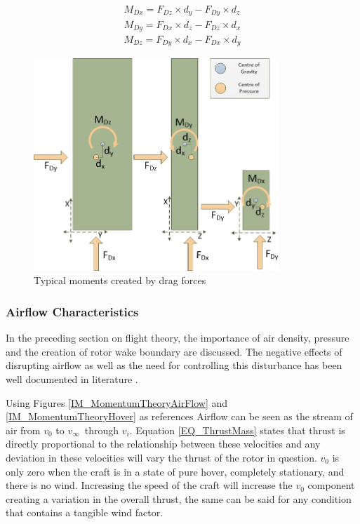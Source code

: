 		\begin{eqnarray}
		M_{Dx} = F_{Dz} \times d_y - F_{Dy} \times d_z \label{EQ_dragMomentsL}\\
		M_{Dy} = F_{Dx} \times d_z - F_{Dz} \times d_x \label{EQ_dragMomentsM}\\
		M_{Dz} = F_{Dy} \times d_x - F_{Dx} \times d_y \label{EQ_dragMomentsN}
		\end{eqnarray}
		
		\begin{figure}[H]
			\centering
			\includegraphics[height = 8cm]{Images/Literature/drag.jpg}     
			\caption{Typical moments created by drag forces}
			\label{IM_dragForces}
		\end{figure} 
				
		\subsubsection{Airflow Characteristics}
		
		In the preceding section on flight theory, the importance of air density, pressure and the creation of rotor wake boundary are discussed. The negative effects of disrupting airflow as well as the need for controlling this disturbance has been well documented in literature \cite{NearWall, Lee2012, Hoffmann}.
		
		Using Figures \ref{IM_MomentumTheoryAirFlow} and \ref{IM_MomentumTheoryHover} as references Airflow can be seen as the stream of air from $v_0$ to $v_\infty$\, through $v_i$. Equation \ref{EQ_ThrustMass} states that thrust is directly proportional to the relationship between these velocities and any deviation in these velocities will vary the thrust of the rotor in question. $v_0$ is only zero when the craft is in a state of pure hover, completely stationary, and there is no wind. Increasing the speed of the craft will increase the $v_0$ component creating a variation in the overall thrust, the same can be said for any condition that contains a tangible wind factor. 
		

